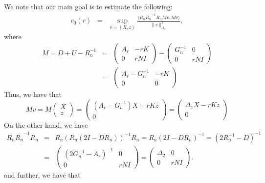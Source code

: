 \documentclass{article}
\theoremstyle{definition}
\begin{document}
We note that our main goal is to estimate the following: 
\begin{eqnarray*}
c_0(r) &=& \sup_{v = (X,z)} \frac{\langle R_n \overline{R_n}^{-1} R_n Mv, Mv \rangle}{\|v\|_{\mathcal{A}_r}^2}, 
\end{eqnarray*}
where 
\begin{eqnarray*}
M = D + U - R_n^{-1} &=& \begin{pmatrix} A_r & -rK \\ 0 & rN I \end{pmatrix} - \begin{pmatrix} G_n^{-1} & 0 \\ 0 & rN I \end{pmatrix} \\
&=& \begin{pmatrix} A_r - G_n^{-1} & -rK \\ 0 & 0 \end{pmatrix} %
\end{eqnarray*}
Thus, we have that 
\begin{equation}
Mv = M \begin{pmatrix} X \\ z \end{pmatrix} = \begin{pmatrix} (A_r - G_n^{-1}) X - rKz \\ 0 \end{pmatrix} = \begin{pmatrix} \Delta_1 X - rKz \\ 0 \end{pmatrix} 
\end{equation}
On the other hand, we have 
\begin{eqnarray*}
R_n \overline{R_n}^{-1} R_n &=& R_n (R_n (2I - DR_n))^{-1} R_n = R_n (2I - DR_n)^{-1} = (2R_n^{-1} - D)^{-1} \\
&=& \begin{pmatrix} (2 G_n^{-1} - A_r)^{-1} & 0 \\ 0 & r N I \end{pmatrix} = \begin{pmatrix} \Delta_2 & 0 \\ 0 & r N I \end{pmatrix}. 
\end{eqnarray*}
and further, we have that 
\end{document}
